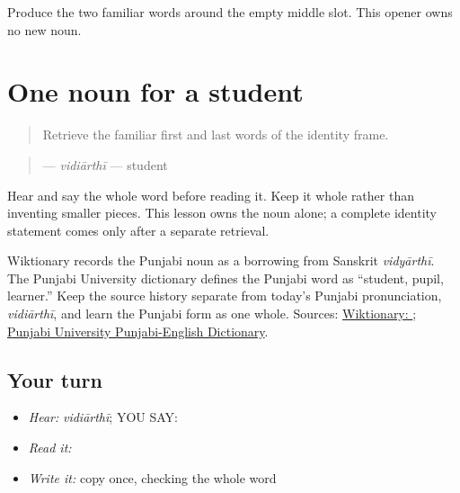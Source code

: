 \begin{tcolorbox}[breakable,colback=teal!4,colframe=teal!35!black,title={Before you move on}]
Produce the two familiar words around the empty middle slot. This opener owns no new noun.
\end{tcolorbox}
\section[\texorpdfstring{\pa{ਵਿਦਿਆਰਥੀ} (vidiarthii)}{ਵਿਦਿਆਰਥੀ (vidiarthii)}]{One noun for a student}

\label{lesson:PA-C194-vidiarthi}



\begin{quote}
Retrieve the familiar first and last words of the identity frame.
\end{quote}

\begin{grammarlens}[title={Grammar Lens: direct owner}]
\begin{quote}
\textbf{} — \emph{vidiārthī} — student
\end{quote}

Hear and say the whole word before reading it. Keep it whole rather than inventing smaller pieces. This lesson owns the noun alone; a complete identity statement comes only after a separate retrieval.
\end{grammarlens}

\begin{tcolorbox}[breakable,skin=enhanced,colback=violet!6,colframe=violet!45!black,boxrule=0.5pt,arc=1mm,left=6pt,right=6pt,top=4pt,bottom=4pt,fonttitle=\bfseries,title={Across the family}]
Wiktionary records the Punjabi noun as a borrowing from Sanskrit \emph{vidyārthī}. The Punjabi University dictionary defines the Punjabi word as “student, pupil, learner.” Keep the source history separate from today's Punjabi pronunciation, \emph{vidiārthī}, and learn the Punjabi form as one whole. Sources: \href{https://en.wiktionary.org/wiki/\%E0\%A8\%B5\%E0\%A8\%BF\%E0\%A8\%A6\%E0\%A8\%BF\%E0\%A8\%86\%E0\%A8\%B0\%E0\%A8\%A5\%E0\%A9\%80}{Wiktionary: }; \href{https://dic.learnpunjabi.org/default.aspx?look=\%E0\%A8\%B5\%E0\%A8\%BF\%E0\%A8\%A6\%E0\%A8\%BF\%E0\%A8\%86\%E0\%A8\%B0\%E0\%A8\%A5\%E0\%A9\%80}{Punjabi University Punjabi-English Dictionary}.
\end{tcolorbox}

\subsection*{Your turn}
\begin{itemize}
\raggedright
  \item \emph{Hear:} \emph{vidiārthī}; YOU SAY: \textbf{}
  \item \emph{Read it:} \textbf{}
  \item \emph{Write it:} copy \textbf{} once, checking the whole word
\end{itemize}

